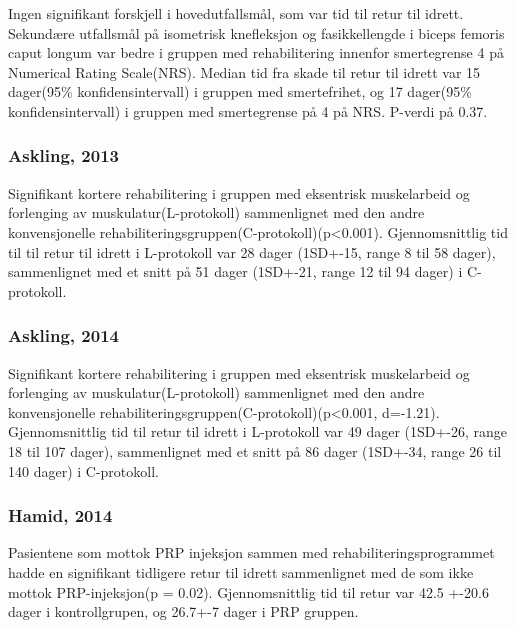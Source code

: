 \documentclass[
]{book}
\begin{document}
Ingen signifikant forskjell i hovedutfallsmål, som var tid til retur til idrett. Sekundære utfallsmål på isometrisk knefleksjon og fasikkellengde i biceps femoris caput longum var bedre i gruppen med rehabilitering innenfor smertegrense 4 på Numerical Rating Scale(NRS). Median tid fra skade til retur til idrett var 15 dager(95\% konfidensintervall) i gruppen med smertefrihet, og 17 dager(95\% konfidensintervall) i gruppen med smertegrense på 4 på NRS. P-verdi på 0.37.

\hypertarget{askling-2013-askling2013}{%
\subsubsection{\texorpdfstring{Askling, 2013 \citep{askling2013}}{Askling, 2013 {[}@askling2013{]}}}\label{askling-2013-askling2013}}

Signifikant kortere rehabilitering i gruppen med eksentrisk muskelarbeid og forlenging av muskulatur(L-protokoll) sammenlignet med den andre konvensjonelle rehabiliteringsgruppen(C-protokoll)(p\textless0.001). Gjennomsnittlig tid til til retur til idrett i L-protokoll var 28 dager (1SD+-15, range 8 til 58 dager), sammenlignet med et snitt på 51 dager (1SD+-21, range 12 til 94 dager) i C-protokoll.

\hypertarget{askling-2014-askling2014}{%
\subsubsection{\texorpdfstring{Askling, 2014 \citep{askling2014}}{Askling, 2014 {[}@askling2014{]}}}\label{askling-2014-askling2014}}

Signifikant kortere rehabilitering i gruppen med eksentrisk muskelarbeid og forlenging av muskulatur(L-protokoll) sammenlignet med den andre konvensjonelle rehabiliteringsgruppen(C-protokoll)(p\textless0.001, d=-1.21). Gjennomsnittlig tid til retur til idrett i L-protokoll var 49 dager (1SD+-26, range 18 til 107 dager), sammenlignet med et snitt på 86 dager (1SD+-34, range 26 til 140 dager) i C-protokoll.

\hypertarget{hamid-2014-ahamid2014}{%
\subsubsection{\texorpdfstring{Hamid, 2014 \citep{ahamid2014}}{Hamid, 2014 {[}@ahamid2014{]}}}\label{hamid-2014-ahamid2014}}

Pasientene som mottok PRP injeksjon sammen med rehabiliteringsprogrammet hadde en signifikant tidligere retur til idrett sammenlignet med de som ikke mottok PRP-injeksjon(p = 0.02). Gjennomsnittlig tid til retur var 42.5 +-20.6 dager i kontrollgrupen, og 26.7+-7 dager i PRP gruppen.
\end{document}
